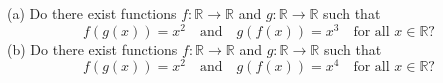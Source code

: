 (a) Do there exist functions $f : \mathbb{R} \to \mathbb{R}$ and $g : \mathbb{R} \to \mathbb{R}$ such that
\[ f(g(x)) = x^2 \quad \text{and} \quad g(f(x)) = x^3 \quad \text{for all } x \in \mathbb{R}? \]
(b) Do there exist functions $f : \mathbb{R} \to \mathbb{R}$ and $g : \mathbb{R} \to \mathbb{R}$ such that
\[ f(g(x)) = x^2 \quad \text{and} \quad g(f(x)) = x^4 \quad \text{for all } x \in \mathbb{R}? \]
